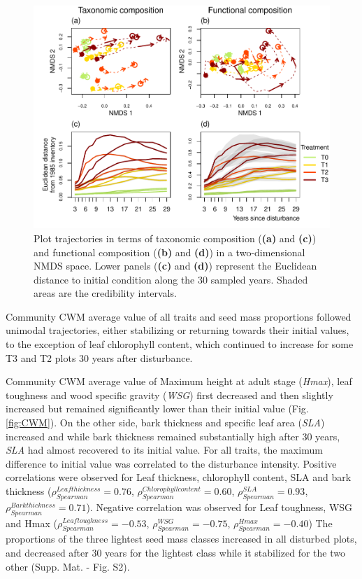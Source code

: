 \documentclass[
  11pt,
  french,
  A4paper,
  extrafontsizes,onecolumn,openright
  ]{memoir}
\begin{document}
\begin{figure}

{\centering \includegraphics[width=1\linewidth]{Manuscript_files/figure-latex/NMDSplans-1} 

}

\caption{Plot trajectories in terms of taxonomic composition (\textbf{(a)} and \textbf{(c)}) and functional composition (\textbf{(b)} and \textbf{(d)}) in a two-dimensional NMDS space. Lower panels (\textbf{(c)} and \textbf{(d)}) represent the Euclidean distance to initial condition along the 30 sampled years. Shaded areas are the credibility intervals.}\label{fig:NMDSplans}
\end{figure}

Community CWM average value of all traits and seed mass proportions
followed unimodal trajectories, either stabilizing or returning towards
their initial values, to the exception of leaf chlorophyll content,
which continued to increase for some T3 and T2 plots 30 years after
disturbance.

Community CWM average value of Maximum height at adult stage
(\emph{Hmax}), leaf toughness and wood specific gravity (\emph{WSG})
first decreased and then slightly increased but remained significantly
lower than their initial value (Fig. \ref{fig:CWM}). On the other side,
bark thickness and specific leaf area (\emph{SLA}) increased and while
bark thickness remained substantially high after 30 years, \emph{SLA}
had almost recovered to its initial value. For all traits, the maximum
difference to initial value was correlated to the disturbance intensity.
Positive correlations were observed for Leaf thickness, chlorophyll
content, SLA and bark thickness
(\(\rho_{Spearman}^{Leaf thickness}=0.76\),
\(\rho_{Spearman}^{Chlorophyll content}=0.60\),
\(\rho_{Spearman}^{SLA}=0.93\),
\(\rho_{Spearman}^{Bark thickness}=0.71\)). Negative correlation was
observed for Leaf toughness, WSG and Hmax
(\(\rho_{Spearman}^{Leaf toughness}=-0.53\),
\(\rho_{Spearman}^{WSG}=-0.75\), \(\rho_{Spearman}^{Hmax}=-0.40\)) The
proportions of the three lightest seed mass classes increased in all
disturbed plots, and decreased after 30 years for the lightest class
while it stabilized for the two other (Supp. Mat. - Fig. S2).
\end{document}
